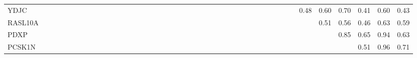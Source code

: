 \begin{longtable}{lrrrrrrrrrrrrrrrrrrrrrrrrrrrrrrrrrrrrrrrrrr}
YDJC          &            &           &               &               &            &             &             &              &               &            &               &             &               &             &               &              &             &              &             &             &             &             &                &                &               &               &                     &              &             &                &            &              &               &            &              &            &          0.48 &       0.60 &         0.70 &           0.41 &            0.60 &          0.43 \\
RASL10A       &            &           &               &               &            &             &             &              &               &            &               &             &               &             &               &              &             &              &             &             &             &             &                &                &               &               &                     &              &             &                &            &              &               &            &              &            &               &       0.51 &         0.56 &           0.46 &            0.63 &          0.59 \\
PDXP          &            &           &               &               &            &             &             &              &               &            &               &             &               &             &               &              &             &              &             &             &             &             &                &                &               &               &                     &              &             &                &            &              &               &            &              &            &               &            &         0.85 &           0.65 &            0.94 &          0.63 \\
PCSK1N        &            &           &               &               &            &             &             &              &               &            &               &             &               &             &               &              &             &              &             &             &             &             &                &                &               &               &                     &              &             &                &            &              &               &            &              &            &               &            &              &           0.51 &            0.96 &          0.71 \\

\end{longtable}
